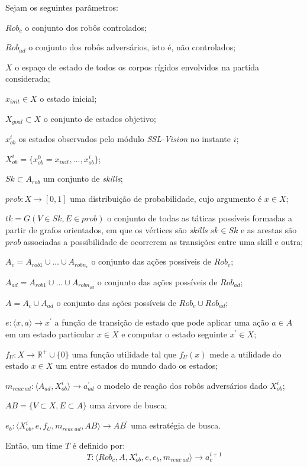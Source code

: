\begin{defi}[Time]\label{def:time}
  Sejam os seguintes parâmetros:

  \begin{description}
    \item $Rob_c$ o conjunto dos robôs controlados;
    \item $Rob_{ad}$ o conjunto dos robôs adversários, isto é, não controlados;
    \item $X$ o espaço de estado de todos os corpos rígidos envolvidos na partida considerada;
    \item $x_{init} \in X$ o estado inicial;
    \item $X_{goal}\subset X$ o conjunto de estados objetivo;
    \item $x_{ob}^{i}$ os estados observados pelo módulo \textit{SSL-Vision} no instante $i$;
    \item $X_{ob}^{i} =  \lbrace{x_{ob}^{0} = x_{init},\dots,x_{ob}^{i}}\rbrace$;
    \item $Sk \subset A_{rob}$ um conjunto de \textit{skills};
    \item $prob: X \longrightarrow [0,1]$ uma distribuição de probabilidade, cujo argumento é
          $x \in X$;
    \item $tk = G(V \in Sk, E \in {prob} )$ o conjunto de todas as táticas possíveis
          formadas a partir de grafos orientados, em que os vértices são \textit{skills} $sk \in Sk$
          e as arestas são $prob$ associadas a possibilidade de ocorrerem as transições
          entre uma skill e outra;
    \item $A_c = A_{rob 1} \cup \dots \cup A_{rob n_c}$ o conjunto das ações possíveis de $Rob_c$;
    \item $A_{ad} = A_{rob 1} \cup \dots \cup A_{rob n_{ad}}$ o conjunto das ações possíveis de $Rob_{ad}$;
    \item $A = A_c \cup A_{ad}$ o conjunto das ações possíveis de $Rob_c \cup Rob_{ad}$;
    \item $e: \langle x,a \rangle \longrightarrow x^{'}$ a função de transição de estado que pode
          aplicar uma ação $a\in A$ em um estado particular
          $x \in X$ e computar o estado seguinte $x^{'} \in X$;
    \item $f_{U}: X \longrightarrow \mathbb{R^{+}} \cup\lbrace 0\rbrace$ uma função utilidade tal que
          $f_{U}(x)$ mede a utilidade do estado $x \in X$ um entre estados do mundo dado os estados;
    \item $m_{reac{\ }ad}: \langle A_{ad}, X_{ob}^{i}\rangle \longrightarrow a_{ad}^{'}$ o modelo de reação dos robôs
          adversários dado $X_{ob}^{i}$;
    \item $AB =\lbrace V \subset X, E \subset A\rbrace$ uma árvore de busca;
    \item $e_b: \langle X_{ob}^{i}, e, f_{U}, m_{reac{\ }ad}, AB\rangle \longrightarrow AB^{'}$ uma estratégia de busca.
  \end{description}

  Então, um time $T$ é definido por:
  \[
    T: \langle Rob_c, A, X_{ob}^{i}, e, e_b, m_{reac{\ }ad} \rangle \longrightarrow a_c^{i+1}
  \]
\end{defi}

